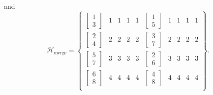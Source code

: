 and
\begin{equation} \label{eq:Hmerge_SFex2}
	\mathcal{H}_{\text{merge}} = \begin{Bmatrix}
		\begin{bmatrix}	1 \\ 3 \end{bmatrix} & 1 & 1 & 1 & 1 & \begin{bmatrix}	1 \\ 5 \end{bmatrix} & 1 & 1 & 1 & 1 \\
		\begin{bmatrix}	2 \\ 4 \end{bmatrix} & 2 & 2 & 2 & 2 & \begin{bmatrix}	3 \\ 7 \end{bmatrix} & 2 & 2 & 2 & 2 \\
		\begin{bmatrix}	5 \\ 7 \end{bmatrix} & 3 & 3 & 3 & 3 & \begin{bmatrix}	2 \\ 6 \end{bmatrix} & 3 & 3 & 3 & 3 \\
		\begin{bmatrix}	6 \\ 8 \end{bmatrix} & 4 & 4 & 4 & 4 & \begin{bmatrix}	4 \\ 8 \end{bmatrix} & 4 & 4 & 4 & 4 \\
	\end{Bmatrix}.
\end{equation}

